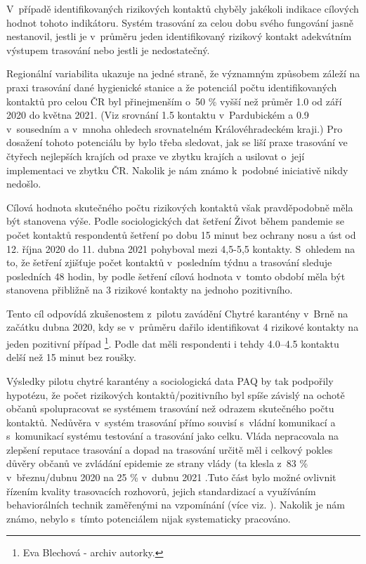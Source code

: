 V~případě identifikovaných rizikových kontaktů chyběly jakékoli indikace cílových hodnot tohoto indikátoru. Systém trasování za celou dobu svého fungování jasně nestanovil, jestli je v~průměru jeden identifikovaný rizikový kontakt adekvátním výstupem trasování nebo jestli je nedostatečný.

Regionální variabilita ukazuje na jedné straně, že významným způsobem záleží na praxi trasování dané hygienické stanice a že potenciál počtu identifikovaných kontaktů pro celou ČR byl přinejmenším o~50 \% vyšší než průměr 1.0 od září 2020 do května 2021. (Viz srovnání 1.5 kontaktu v~Pardubickém a 0.9 v~sousedním a v~mnoha ohledech srovnatelném Královéhradeckém kraji.) Pro dosažení tohoto potenciálu by bylo třeba sledovat, jak se liší praxe trasování ve čtyřech nejlepších krajích od praxe ve zbytku krajích a usilovat o~její implementaci ve zbytku ČR. Nakolik je nám známo k~podobné iniciativě nikdy nedošlo.

Cílová hodnota skutečného počtu rizikových kontaktů však pravděpodobně měla být stanovena výše. Podle sociologických dat šetření Život během pandemie \cite{tr_PAQ01} se počet kontaktů respondentů šetření po dobu 15 minut bez ochrany nosu a úst od 12. října 2020 do 11. dubna 2021 pohyboval mezi 4,5-5,5 kontakty. S~ohledem na to, že šetření zjišťuje počet kontaktů v~posledním týdnu a trasování sleduje posledních 48 hodin, by podle šetření cílová hodnota v~tomto období měla být stanovena přibližně na 3 rizikové kontakty na jednoho pozitivního.

Tento cíl odpovídá zkušenostem z~pilotu zavádění Chytré karantény v~Brně na začátku dubna 2020, kdy se v~průměru dařilo identifikovat 4 rizikové kontakty na jeden pozitivní případ \footnote{Eva Blechová - archiv autorky.}. Podle dat \cite{tr_PAQ01} měli respondenti i tehdy 4.0--4.5 kontaktu delší než 15 minut bez roušky.

Výsledky pilotu chytré karantény a sociologická data PAQ by tak podpořily hypotézu, že počet rizikových kontaktů/pozitivního byl spíše závislý na ochotě občanů spolupracovat se systémem trasování než odrazem skutečného počtu kontaktů. Nedůvěra v~systém trasování přímo souvisí s~vládní komunikací a s~komunikací systému testování a trasování jako celku. Vláda nepracovala na zlepšení reputace trasování \cite{tr_bisop01} a dopad na trasování určitě měl i celkový pokles důvěry občanů ve zvládání epidemie ze strany vlády (ta klesla z~83 \% v~březnu/dubnu 2020 na 25 \% v~dubnu 2021 \cite{tr_STEM}.Tuto část bylo možné ovlivnit řízením kvality trasovacích rozhovorů, jejich standardizací a využíváním behaviorálních technik zaměřenými na vzpomínání (více viz. \cite{tr_bisop06}). Nakolik je nám známo, nebylo s~tímto potenciálem nijak systematicky pracováno.

